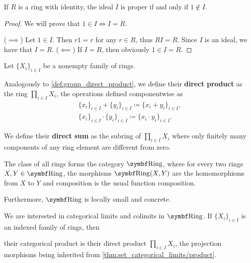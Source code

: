 \begin{proposition}\label{thm:proper_ideals_containing_identity}
  If \( R \) is a ring with identity, the ideal \( I \) is proper if and only if \( 1 \not\in I \).
\end{proposition}
\begin{proof}
  We will prove that \( 1 \in I \iff I = R \).

  (\( \implies \)) Let \( 1 \in I \). Then \( r1 = r \) for any \( r \in R \), thus \( RI = R \). Since \( I \) is an ideal, we have that \( I = R \).
  (\( \impliedby \)) If \( I = R \), then obviously \( 1 \in I = R \).
\end{proof}

\begin{definition}\label{def:ring_direct_product}
  Let \( \{ X_i \}_{i \in I} \) be a nonempty family of rings.

  Analogously to \cref{def:group_direct_product}, we define their \textbf{direct product} as the ring \( \prod_{i \in I} X_i \), the operations defined componentwise as
  \begin{align*}
    &\{ x_i \}_{i \in I} + \{ y_i \}_{i \in I}
    \coloneqq
    \{ x_i + y_i \}_{i \in I}, \\
    &\{ x_i \}_{i \in I} \cdot \{ y_i \}_{i \in I}
    \coloneqq
    \{ x_i \cdot y_i \}_{i \in I}.
  \end{align*}

  We define their \textbf{direct sum} as the subring of \( \prod_{i \in I} X_i \) where only finitely many components of any ring element are different from zero.
\end{definition}

\begin{definition}\label{def:category_of_rings}
  The class of all rings forms the category \( \Bold{Ring} \), where for every two rings \( X, Y \in \Bold{Ring} \), the morphisms \( \Bold{Ring}(X, Y) \) are the homomorphisms from \( X \) to \( Y \) and composition is the usual function composition.

  Furthermore, \( \Bold{Ring} \) is locally small and concrete.
\end{definition}

\begin{proposition}\label{thm:ring_categorical_limits}
  We are interested in categorical limits and colimits in \( \Bold{Ring} \). If \( \{ X_i \}_{i \in I} \) is an indexed family of rings, then
  \begin{defenum}
    \item\label{thm:ring_categorical_limits/product} their categorical product is their direct product \( \prod_{i \in I} X_i \), the projection morphisms being inherited from \cref{thm:set_categorical_limits/product}.
  \end{defenum}
\end{proposition}

